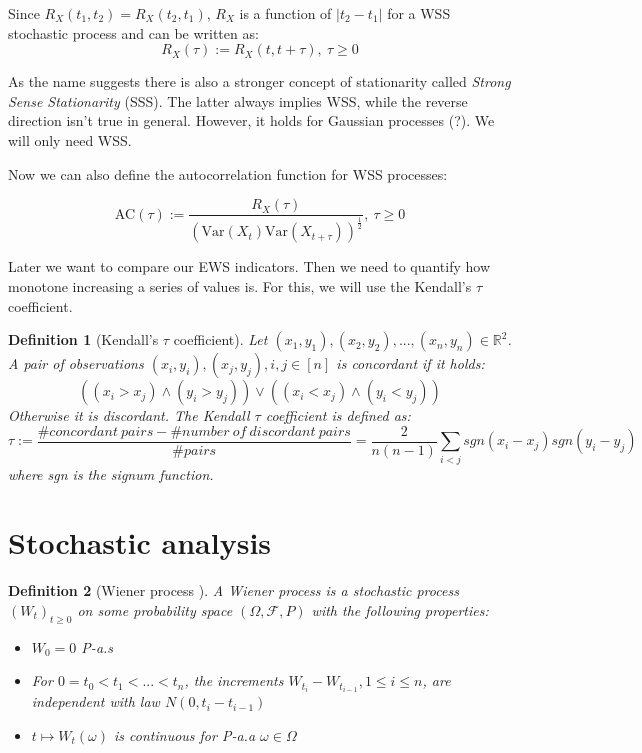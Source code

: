 \documentclass[%
thesis=student,%
coverpage=false,%
titlepage=false,%
headmarks=true, %
english,%
font=libertine, %
math=newpxtx, %
BCOR=5mm,%
coverBCOR=11mm%
]{tumbook}
\newtheorem{definition}{Definition}[section]
\begin{document}
Since $R_{X}(t_{1},t_{2}) = R_{X}(t_{2},t_{1})$, $R_{X}$ is a function of $\lvert t_{2} - t_{1} \rvert$ for a WSS stochastic process and can be written as:
\[
R_{X}(\tau) := R_{X}(t,t + \tau), \ \tau \geq 0
\]

As the name suggests there is also a stronger concept of stationarity called \textit{Strong Sense Stationarity} (SSS). The latter always implies WSS, while the reverse direction isn't true in general. However, it holds for Gaussian processes (?). We will only need WSS.

Now we can also define the autocorrelation function for WSS processes:

\[
\text{AC}(\tau) := \frac{R_{X}(\tau)}{(\text{Var}(X_{t})\text{Var}(X_{t+\tau}))^{\frac{1}{2}}}, \ \tau \geq 0
\]

Later we want to compare our EWS indicators. Then we need to quantify how monotone increasing a series of values is. For this, we will use the Kendall's $\tau$ coefficient. 

\begin{definition}[Kendall's $\tau$ coefficient]
\label{def:Kendall tau}
Let $(x_{1},y_{1}),(x_{2},y_{2}),...,(x_{n},y_{n})\in \mathbb{R}^{2}$. A pair of observations $(x_{i},y_{i}),(x_{j},y_{j}), i,j \in [n]$ is concordant if it holds:
\[
((x_{i} > x_{j}) \wedge (y_{i} > y_{j})) \vee
((x_{i} < x_{j}) \wedge (y_{i} < y_{j}))
\]
Otherwise it is discordant. The Kendall $\tau$ coefficient is defined as:
\[
\tau := \frac{\#concordant\ pairs - \#number\ of\ discordant\ pairs}{\#pairs} = \frac{2}{n(n-1)}\sum_{i<j}sgn(x_{i}-x_{j})sgn(y_{i}-y_{j})
\]
where sgn is the signum function.    
\end{definition}


\section{Stochastic analysis}
\label{stochastic analysis}

\begin{definition}[Wiener process \cite{gantert:2024}]
A Wiener process is a stochastic process $(W_{t})_{t\geq 0}$ on some probability space $(\Omega,\mathcal{F},P)$ with the following properties: 
\begin{itemize}
    \item $W_{0} = 0$ P-a.s
    \item For $0 = t_{0} < t_{1} < ... < t_{n}$, the increments $W_{t_{i}} - W_{t_{i-1}}, 1 \leq i \leq n$, are independent with law $N(0,t_{i}-t_{i-1})$
    \item $t \mapsto W_{t}(\omega)$ is continuous for P-a.a $\omega \in \Omega$
\end{itemize}
\end{definition}
\end{document}
